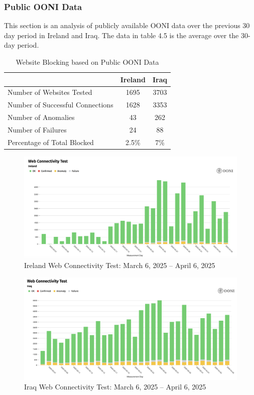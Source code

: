 \subsubsection{Public OONI Data}

This section is an analysis of publicly available OONI data over the previous 30 day period in Ireland and Iraq. The data in table 4.5 is the average over the 30-day period.

\begin{table}[H]
\centering
\caption{Website Blocking based on Public OONI Data}
\begin{tabular}{lcc}
\toprule
\textbf{} & \textbf{Ireland} & \textbf{Iraq} \\
\midrule
Number of Websites Tested           & 1695 & 3703 \\
Number of Successful Connections    & 1628 & 3353 \\
Number of Anomalies                 & 43 & 262 \\
Number of Failures                  & 24 & 88 \\
\bottomrule
Percentage of Total Blocked         & 2.5\% & 7\% \\
\end{tabular}
\label{tab:category_block}
\end{table}

\begin{figure}[H]
    \centering
    \includegraphics[width=\textwidth]{Griff/TCD SCSS CAPSTONE/Results/IrelandWebsiteTest.png}
    \caption{Ireland Web Connectivity Test: March 6, 2025 -- April 6, 2025}
    \label{fig:iraq-middlebox-HTTP-manipulation}
\end{figure}

\begin{figure}[H]
    \centering
    \includegraphics[width=\textwidth]{Griff/TCD SCSS CAPSTONE/Results/IraqWebsiteTest.png}
    \caption{Iraq Web Connectivity Test: March 6, 2025 -- April 6, 2025}
    \label{fig:iraq-middlebox-HTTP-manipulation}
\end{figure}

